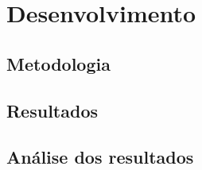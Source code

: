 \section{Desenvolvimento}

\lipsum[2-5]

\subsection{Metodologia}

\lipsum

\lipsum

\lipsum

\subsection{Resultados}

\lipsum

\subsection{Análise dos resultados}

\lipsum